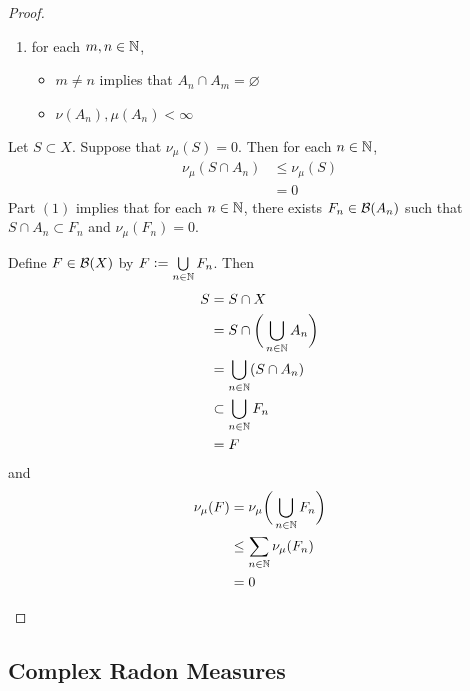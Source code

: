 \documentclass{book}
\begin{document}
\begin{proof}
\begin{enumerate}
\begin{enumerate}
				\item for each $m,n \in \mathbb{N}$,
				\begin{itemize}
					\item $m \neq n$ implies that $A_n \cap A_m = \varnothing$
					\item $\nu(A_n), \mu(A_n) < \infty$
				\end{itemize}
			\end{enumerate} 
			Let $S \subset X$. Suppose that $\nu_{\mu}(S) = 0$. Then for each $n \in \mathbb{N}$,  
			\begin{align*}
				\nu_{\mu}(S \cap A_n) 
				& \leq \nu_{\mu}(S) \\
				& = 0 
			\end{align*} 
			Part $(1)$ implies that for each $n \in \mathbb{N}$, there exists $F_n \in \mathcal{B}(A_n)$ such that $S \cap A_n \subset F_n$ and $\nu_{\mu}(F_n) = 0$.
			
			
			Define $F \in \mathcal{B}(X)$ by $F \vcentcolon= \bigcup\limits_{n \in \mathbb{N}} F_n$. Then
			\begin{align*}
				S
				& = S \cap X \\
				& = S \cap \bigg( \bigcup\limits_{n \in \mathbb{N}} A_n \bigg) \\
				& = \bigcup\limits_{n \in \mathbb{N}} (S \cap A_n) \\
				& \subset \bigcup\limits_{n \in \mathbb{N}} F_n \\
				& = F
			\end{align*}
			and 
			\begin{align*}
				\nu_{\mu}(F)
				& = \nu_{\mu}\bigg( \bigcup\limits_{n \in \mathbb{N}} F_n \bigg) \\
				& \leq \sum_{n \in \mathbb{N}} \nu_{\mu}(F_n) \\
				& = 0
			\end{align*}
		\end{enumerate}
	\end{proof}
	






	
	
	
	
	
	
	
	
	
	
	
	
	
	
	
	
	
	
	
	
	\subsection{Complex Radon Measures}
	
\end{document}
